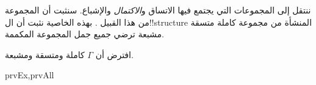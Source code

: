 \documentclass[../../../include/open-logic-section]{subfiles}
\begin{document}
\begin{explain}
ننتقل إلى المجموعات التي يجتمع فيها الاتساق و\emph{الاكتمال} والإشباع.
سنثبت أن المجموعة من هذا القبيل
. بهذه الخاصية نثبت أن ال!!{structure} المنشأة من
مجموعة كاملة متسقة مشبعة ترضي جميع جمل المجموعة المكممة.
\end{explain}

\begin{prop}
افترض أن $\Gamma$ كاملة ومتسقة ومشبعة.
\begin{tagenumerate}{prvEx,prvAll}
\end{tagenumerate}
\end{prop}
\end{document}
